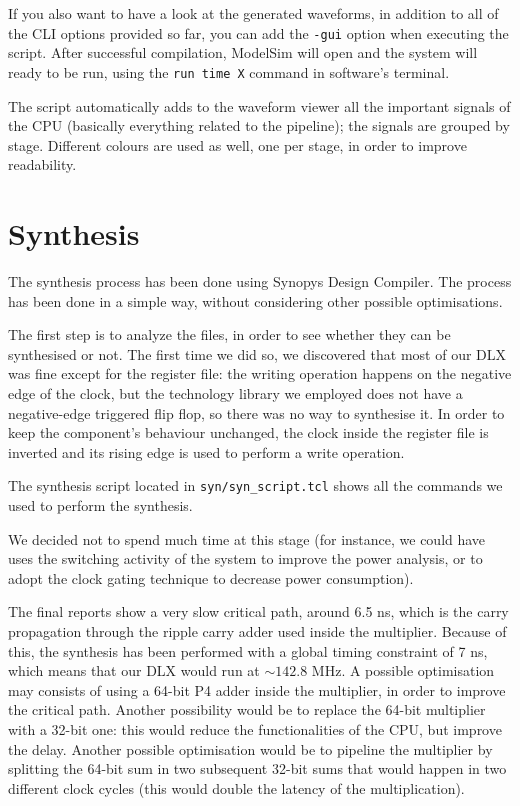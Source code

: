 If you also want to have a look at the generated waveforms, in addition to all of the CLI options provided so far, you can add the \texttt{-gui} option when executing the script. 
After successful compilation, ModelSim will open and the system will ready to be run, using the \texttt{run time X} command in software's terminal. 

The script automatically adds to the waveform viewer all the important signals of the CPU (basically everything related to the pipeline); the signals are grouped by stage.
Different colours are used as well, one per stage, in order to improve readability.

\section{Synthesis} \label{syn_chap}

The synthesis process has been done using Synopys Design Compiler.
The process has been done in a simple way, without considering other possible optimisations. 

The first step is to analyze the files, in order to see whether they can be synthesised or not. 
The first time we did so, we discovered that most of our DLX was fine except for the register file: the writing operation happens on the negative edge of the clock, but the technology library we employed does not have a negative-edge triggered flip flop, so there was no way to synthesise it. 
In order to keep the component's behaviour unchanged, the clock inside the register file is inverted and its rising edge is used to perform a write operation.

The synthesis script located in \texttt{syn/syn\_script.tcl} shows all the commands we used to perform the synthesis. 

We decided not to spend much time at this stage (for instance, we could have uses the switching activity of the system to improve the power analysis, or to adopt the clock gating technique to decrease power consumption). 

The final reports show a very slow critical path, around 6.5 \si{\nano\second}, which is the carry propagation through the ripple carry adder used inside the multiplier. 
Because of this, the synthesis has been performed with a global timing constraint of 7 \si{\nano\second}, which means that our DLX would run at $\sim 142.8$ \si{\MHz}.
A possible optimisation may consists of using a 64-bit P4 adder inside the multiplier, in order to improve the critical path. 
Another possibility would be to replace the 64-bit multiplier with a 32-bit one: this would reduce the functionalities of the CPU, but improve the delay.
Another possible optimisation would be to pipeline the multiplier by splitting the 64-bit sum in two subsequent 32-bit sums that would happen in two different clock cycles (this would double the latency of the multiplication). 

